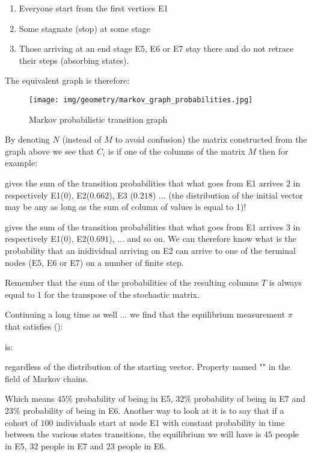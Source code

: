 {\begin{enumerate}
		\item Everyone start from the first vertices E1

		\item Some stagnate (stop) at some stage

		\item Those arriving at an end stage E5, E6 or E7 stay there and do not retrace their steps (absorbing states).
	\end{enumerate}
	The equivalent graph is therefore:
	\begin{figure}[H]
		\centering
		\texttt{[image: img/geometry/markov\_graph\_probabilities.jpg]}
		\caption[]{Markov probabilistic transition graph}
	\end{figure}
	By denoting $N$ (instead of $M$ to avoid confusion) the matrix constructed from the graph above we see that $C_i$ is if one of the columns of the matrix $M$ then for example:
	
	gives the sum of the transition probabilities that what goes from E1 arrives $2$ in respectively E1($0$), E2($0.662$), E3 ($0.218$) ... (the distribution of the initial vector may be any as long as the sum of column of values is equal to 1)!
	
	
	gives the sum of the transition probabilities that what goes from E1 arrives $3$ in respectively E1($0$), E2($0.691$), ... and so on. We can therefore know what is the probability that an inidividual arriving on E2 can arrive to one of the terminal nodes (E5, E6 or E7) on a number of finite step.

	\begin{tcolorbox}[title=Remark,colframe=black,arc=10pt]
	Remember that the sum of the probabilities of the resulting columns $T$ is always equal to $1$ for the transpose of the stochastic matrix.
	\end{tcolorbox}
	Continuing a long time as well ... we find that the equilibrium measurement $\pi$ that satisfies ():
	
	is:
	
	
	regardless of the distribution of the starting vector. Property named "" in the field of Markov chains.

	Which means $45\%$ probability of being in E5, $32\%$ probability of being in E7 and $23\%$ probability of being in E6. Another way to look at it is to say that if a cohort of $100$ individuals start at node E1 with constant probability in time between the various states transitions, the equilibrium we will have is $45$ people in E5, $32$ people in E7 and $23$ people in E6.

}
